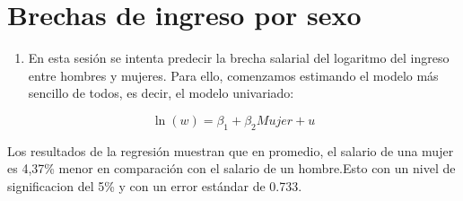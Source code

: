 \documentclass[
  11pt,
  letterpaper,
]{article}
\providecommand{\tightlist}{%
  \setlength{\itemsep}{0pt}\setlength{\parskip}{0pt}}
\begin{document}
\hypertarget{brechas-de-ingreso-por-sexo}{%
\section{Brechas de ingreso por
sexo}\label{brechas-de-ingreso-por-sexo}}

\begin{enumerate}
\def\labelenumi{\alph{enumi})}
\tightlist
\item
  En esta sesión se intenta predecir la brecha salarial del logaritmo
  del ingreso entre hombres y mujeres. Para ello, comenzamos estimando
  el modelo más sencillo de todos, es decir, el modelo univariado:
\end{enumerate}

\begin{equation}
\ln (w) = \beta_1 + \beta_2 Mujer+u
  \label{gap0}
\end{equation}

Los resultados de la regresión muestran que en promedio, el salario de
una mujer es 4,37\% menor en comparación con el salario de un
hombre.Esto con un nivel de significacion del 5\% y con un error
estándar de 0.733.
\end{document}
